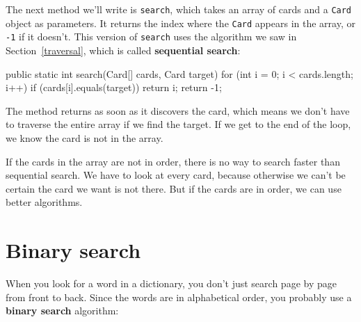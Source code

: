 \documentclass[12pt]{book}
\theoremstyle{exercise}
\newcommand{\java}[1]{\verb"#1"}
\begin{document}

The next method we'll write is \java{search}, which takes an array of cards and a \java{Card} object as parameters.
It returns the index where the \java{Card} appears in the array, or \java{-1} if it doesn't.
This version of \java{search} uses the algorithm we saw in Section~\ref{traversal}, which is called {\bf sequential search}:


\begin{code}
public static int search(Card[] cards, Card target) {
    for (int i = 0; i < cards.length; i++) {
        if (cards[i].equals(target)) {
            return i;
        }
    }
    return -1;
}
\end{code}



The method returns as soon as it discovers the card, which means we don't have to traverse the entire array if we find the target.
If we get to the end of the loop, we know the card is not in the array.

If the cards in the array are not in order, there is no way to search faster than sequential search.
We have to look at every card, because otherwise we can't be certain the card we want is not there.
But if the cards are in order, we can use better algorithms.



\section{Binary search}


When you look for a word in a dictionary, you don't just search page by page from front to back.
Since the words are in alphabetical order, you probably use a {\bf binary search} algorithm:
\end{document}

